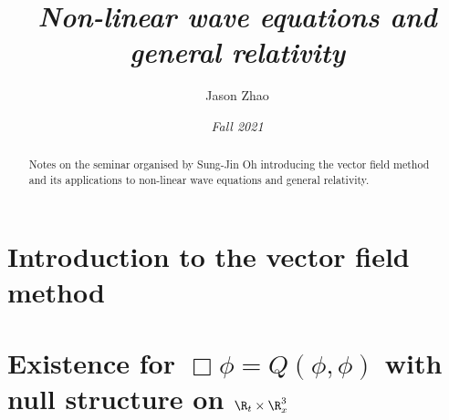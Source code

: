 \documentclass[10pt, reqno]{article}
\title
{
	\emph{Non-linear wave equations and general relativity}
}
\author{Jason Zhao}
\date{\emph{Fall 2021}}
\theoremstyle{definition}
\theoremstyle{remark}
\begin{document}
\maketitle

\begin{abstract}
	Notes on the seminar organised by Sung-Jin Oh introducing the vector field method and its applications to non-linear wave equations and general relativity. 
\end{abstract}

\tableofcontents

\section{Introduction to the vector field method}


\section{Existence for $\Box \phi = Q(\phi, \phi)$ with null structure on $\R_t \times \R^3_x$}




 
\end{document}
